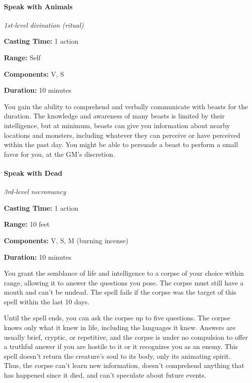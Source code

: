 \documentclass[
]{article}
\begin{document}
\hypertarget{speak-with-animals}{%
\paragraph{Speak with Animals}\label{speak-with-animals}}

\emph{1st-level divination (ritual)}

\textbf{Casting Time:} 1 action

\textbf{Range:} Self

\textbf{Components:} V, S

\textbf{Duration:} 10 minutes

You gain the ability to comprehend and verbally communicate with beasts
for the duration. The knowledge and awareness of many beasts is limited
by their intelligence, but at minimum, beasts can give you information
about nearby locations and monsters, including whatever they can
perceive or have perceived within the past day. You might be able to
persuade a beast to perform a small favor for you, at the GM's
discretion.

\hypertarget{speak-with-dead}{%
\paragraph{Speak with Dead}\label{speak-with-dead}}

\emph{3rd-level necromancy}

\textbf{Casting Time:} 1 action

\textbf{Range:} 10 feet

\textbf{Components:} V, S, M (burning incense)

\textbf{Duration:} 10 minutes

You grant the semblance of life and intelligence to a corpse of your
choice within range, allowing it to answer the questions you pose. The
corpse must still have a mouth and can't be undead. The spell fails if
the corpse was the target of this spell within the last 10 days.

Until the spell ends, you can ask the corpse up to five questions. The
corpse knows only what it knew in life, including the languages it knew.
Answers are usually brief, cryptic, or repetitive, and the corpse is
under no compulsion to offer a truthful answer if you are hostile to it
or it recognizes you as an enemy. This spell doesn't return the
creature's soul to its body, only its animating spirit. Thus, the corpse
can't learn new information, doesn't comprehend anything that has
happened since it died, and can't speculate about future events.
\end{document}

